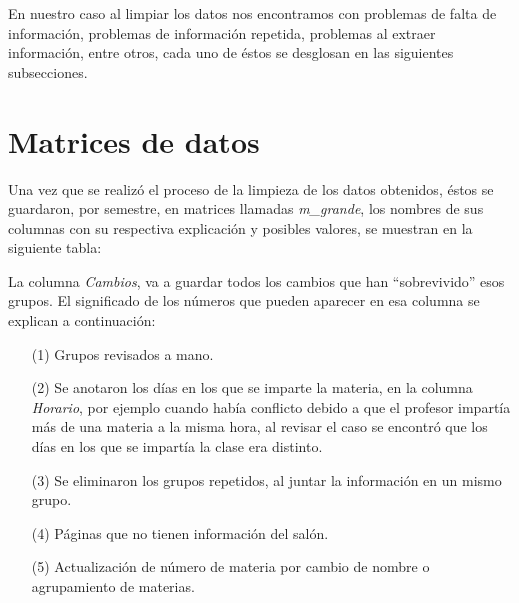 En nuestro caso al limpiar los datos nos encontramos con problemas de falta de información, problemas de información repetida, problemas al extraer información, entre otros, cada uno de éstos se desglosan en las siguientes subsecciones.


\section{Matrices de datos}

Una vez que se realizó el proceso de la limpieza de los datos obtenidos, éstos se guardaron, por semestre, en matrices llamadas \textit{m\_grande}, los nombres de sus columnas con su respectiva explicación y posibles valores, se muestran en la siguiente tabla:

\dfNmatrizGrande %

La columna \textit{Cambios}, va a guardar todos los cambios que han ``sobrevivido'' esos grupos. El significado de los números que pueden aparecer en esa columna se explican a continuación:

\begin{enumerate}
\item[(1)] Grupos revisados a mano.

\item[(2)] Se anotaron los días en los que se imparte la materia, en la columna \textit{Horario}, por ejemplo cuando había conflicto debido a que el profesor impartía más de una materia a la misma hora, al revisar el caso se encontró que los días en los que se impartía la clase era distinto.

\item[(3)] Se eliminaron los grupos repetidos, al juntar la información en un mismo grupo.

\item[(4)] Páginas que no tienen información del salón.

\item[(5)] Actualización de número de materia por cambio de nombre o agrupamiento de materias.
\end{enumerate}
